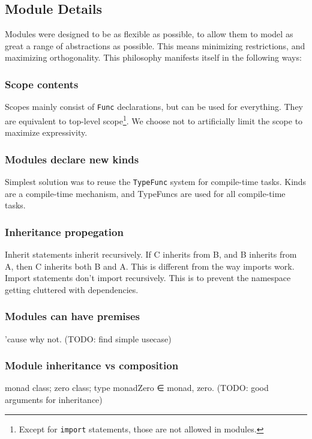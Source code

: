 \subsection{Module Details}
Modules were designed to be as flexible as possible, to allow them to model as great a range of abstractions as possible.
This means minimizing restrictions, and maximizing orthogonality.
This philosophy manifests itself in the following ways:

\subsubsection*{Scope contents}
Scopes mainly consist of \texttt{Func} declarations, but can be used for everything.
They are equivalent to top-level scope\footnote{Except for \texttt{import} statements, those are not allowed in modules.}. 
We choose not to artificially limit the scope to maximize expressivity.

\subsubsection*{Modules declare new kinds}
Simplest solution was to reuse the \texttt{TypeFunc} system for compile-time tasks.
Kinds are a compile-time mechanism, and TypeFuncs are used for all compile-time tasks.

\subsubsection*{Inheritance propegation}
Inherit statements inherit recursively.
If C inherits from B, and B inherits from A, then C inherits both B and A.
This is different from the way imports work.
Import statements don't import recursively.
This is to prevent the namespace getting cluttered with dependencies.

\subsubsection*{Modules can have premises}
'cause why not. (TODO: find simple usecase)

\subsubsection*{Module inheritance vs composition}
monad class; zero class; type monadZero ∈ monad, zero.
(TODO: good arguments for inheritance)
